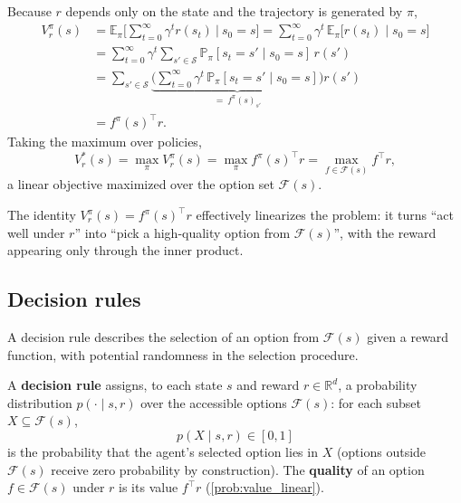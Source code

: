 \documentclass[11pt]{article}
\newcommand{\cS}{\mathcal{S}}
\newcommand{\R}{\mathbb{R}}
\newcommand{\E}{\mathbb{E}}
\newcommand{\Prob}{\mathbb{P}}
\newcommand{\F}{\mathcal{F}}       %
\begin{document}
\begin{solution}
Because $r$ depends only on the state and the trajectory is generated by $\pi$,
\begin{align*}
V^\pi_r(s)
&= \E_\pi\Big[\textstyle\sum_{t=0}^\infty \gamma^t r(s_t)\ \Big|\ s_0 = s\Big]
 = \sum_{t=0}^\infty \gamma^t\, \E_\pi\bigl[r(s_t)\mid s_0 = s\bigr] \\
&= \sum_{t=0}^\infty \gamma^t \sum_{s'\in\cS} \Prob_\pi[s_t = s' \mid s_0 = s]\, r(s') \\
&= \sum_{s'\in\cS} \underbrace{\Big(\sum_{t=0}^\infty \gamma^t\, \Prob_\pi[s_t = s'\mid s_0=s]\Big)}_{=\ f^\pi(s)_{s'}} r(s') \\
&= f^\pi(s)^\top r.
\end{align*}
Taking the maximum over policies,
$$
V^\ast_r(s) = \max_\pi V^\pi_r(s) = \max_\pi f^\pi(s)^\top r = \max_{f \in \F(s)} f^\top r,
$$
a linear objective maximized over the option set $\F(s)$.
\end{solution}

The identity $V^\pi_r(s) = f^\pi(s)^\top r$ effectively linearizes the problem: it turns
``act well under $r$'' into ``pick a high-quality option from $\F(s)$'', with the reward
appearing only through the inner product. 

\subsection*{Decision rules}

A decision rule describes the selection of an option from $\F(s)$ given a reward function, with potential randomness in the selection procedure. 

\begin{definition}\label{def:decision_rule}
A \textbf{decision rule} assigns, to each state $s$ and reward $r \in \R^d$, a probability
distribution $p(\cdot \mid s, r)$ over the accessible options $\F(s)$: for each subset
$X \subseteq \F(s)$,
$$
p(X \mid s, r) \in [0,1]
$$
is the probability that the agent's selected option lies in $X$ (options outside $\F(s)$
receive zero probability by construction). The \textbf{quality} of an option $f \in \F(s)$
under $r$ is its value $f^\top r$ (\cref{prob:value_linear}).
\end{definition}
\end{document}
